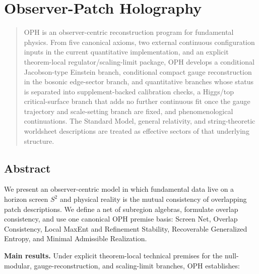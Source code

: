 \section{Observer-Patch Holography}\label{observer-patch-holography}

\begin{quote}
OPH is an observer-centric reconstruction program for fundamental physics. From five canonical axioms, two external continuous configuration inputs in the current quantitative implementation, and an explicit theorem-local regulator/scaling-limit package, OPH develops a conditional Jacobson-type Einstein branch, conditional compact gauge reconstruction in the bosonic edge-sector branch, and quantitative branches whose status is separated into supplement-backed calibration checks, a Higgs/top critical-surface branch that adds no further continuous fit once the gauge trajectory and scale-setting branch are fixed, and phenomenological continuations. The Standard Model, general relativity, and string-theoretic worldsheet descriptions are treated as effective sectors of that underlying structure.
\end{quote}

\subsection{Abstract}\label{abstract}

We present an observer-centric model in which fundamental data live on a horizon screen \(S^2\) and physical reality is the mutual consistency of overlapping patch descriptions. We define a net of subregion algebras, formulate overlap consistency, and use one canonical OPH premise basis: Screen Net, Overlap Consistency, Local MaxEnt and Refinement Stability, Recoverable Generalized Entropy, and Minimal Admissible Realization.

\textbf{Main results.} Under explicit theorem-local technical premises for the null-modular, gauge-reconstruction, and scaling-limit branches, OPH establishes:


